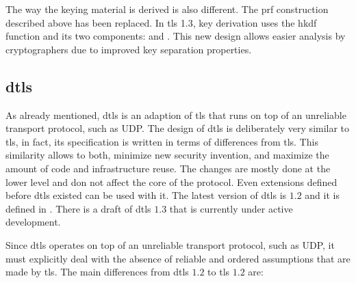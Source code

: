 \documentclass{llncs}
\begin{document}
The way the keying material is derived is also different. The
\gls{prf} construction described above has been replaced.
In \gls{tls} 1.3, key derivation uses the
\gls{hkdf} function \cite{RFC5869} and its two components:  and .
This new design allows easier analysis by cryptographers due to improved
key separation properties.

%
\subsection{\gls{dtls}} \label{dtls}

As already mentioned, \gls{dtls} is an adaption of \gls{tls} that runs on
top of an unreliable transport protocol, such as UDP. The design of \gls{dtls} is deliberately very similar to \gls{tls}, in fact, its specification is written
in terms of differences from \gls{tls}. This similarity allows to
both, minimize new security invention, and maximize the amount of code and infrastructure reuse. The changes are mostly done at the lower level and
don not affect the core of the protocol.
Even extensions defined before \gls{dtls} existed can be
used with it. The latest version of \gls{dtls} is $1.2$ and it is defined
in \cite{RFC6347}. There is a draft of \gls{dtls} $1.3$
\cite{I-D.ietf-tls-dtls13} that is currently under active development.

Since \gls{dtls} operates on top of an unreliable transport protocol, such as
UDP, it must explicitly deal with the absence of reliable and ordered assumptions
that are made by \gls{tls}. The main differences from \gls{dtls} $1.2$ to \gls{tls} $1.2$ are:
\end{document}
